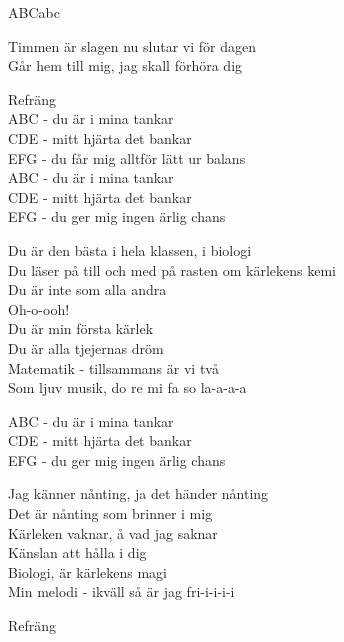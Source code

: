 \begin{song}{ABC}{abc}
\begin{vers}
Timmen är slagen nu slutar vi för dagen\\
Går hem till mig, jag skall förhöra dig\\
\end{vers}
\begin{vers}
Refräng\\
ABC - du är i mina tankar\\
CDE - mitt hjärta det bankar\\
EFG - du får mig alltför lätt ur balans\\
ABC - du är i mina tankar\\
CDE - mitt hjärta det bankar\\
EFG - du ger mig ingen ärlig chans\\
\end{vers}
\begin{vers}
Du är den bästa i hela klassen, i biologi\\
Du läser på till och med på rasten om kärlekens kemi\\
Du är inte som alla andra\\
Oh-o-ooh!\\
Du är min första kärlek\\
Du är alla tjejernas dröm\\
Matematik - tillsammans är vi två\\
Som ljuv musik, do re mi fa so la-a-a-a\\
\end{vers}
\begin{vers}
ABC - du är i mina tankar\\
CDE - mitt hjärta det bankar\\
EFG - du ger mig ingen ärlig chans\\
\end{vers}
\begin{vers}
Jag känner nånting, ja det händer nånting\\
Det är nånting som brinner i mig\\
Kärleken vaknar, å vad jag saknar\\
Känslan att hålla i dig\\
Biologi, är kärlekens magi\\
Min melodi - ikväll så är jag fri-i-i-i-i\\
\end{vers}
\begin{vers}
Refräng\\
\end{vers}
\end{song}
